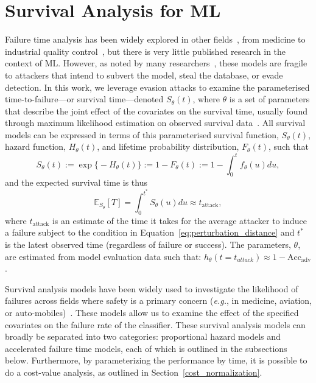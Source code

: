 \section{Survival Analysis for ML}
\label{aft_models}

Failure time analysis has been widely explored in other fields~\cite{aft_models}, from medicine to industrial quality control~\cite{ai_medical_imaging,ai_industry,ai_luggage}, but there is very little published research in the context of ML\@.
However, as noted by many researchers~\cite{madry2017towards,carlini_towards_2017,meyers}, these models are fragile to attackers that intend to subvert the model, steal the database, or evade detection.
In this work, we leverage evasion attacks to examine the parameterised time-to-failure---or survival time---denoted $S_{\theta}(t)$, where $\theta$ is a set of parameters that describe the joint effect of the covariates on the survival time, usually found through maximum likelihood estimation on observed survival data~\cite{collett2023modelling}.
All survival models can be expressed in terms of this parameterised survival function, $S_\theta(t)$, hazard function, $H_\theta(t)$, and lifetime probability distribution, $F_{\theta}(t)$, such that
\[
	S_{\theta}(t) := \exp\big\{-H_{\theta}(t)\big\} := 1 - F_{\theta}(t) := 1 - \int_0^t f_\theta(u) du,
\]
and the expected survival time is thus
\[
	\mathbb{E}_{S_\theta}[T] =  \int_{0}^{t^*} S_{\theta}(u) du \approx t_{\mathrm{attack}},
\]
where $t_{\mathrm{attack}}$ is an estimate of the time it takes for the average attacker to induce a failure subject to the condition in Equation~\ref{eq:perturbation_distance} and $t^*$ is the latest observed time (regardless of failure or success).
The parameters, $\theta$, are estimated from model evaluation data such that: $h_{\theta}(t=t_{attack}) \approx 1 - \mathrm{Acc}_{\mathrm{adv}}$.

Survival analysis models have been widely used to investigate the likelihood of failures across fields where safety is a primary concern (\textit{e.g.}, in medicine, aviation, or auto-mobiles)~\cite{liu2013development,lawless1995methods}. These models allow us to examine the effect of the specified covariates on the failure rate of the classifier.
These survival analysis models can broadly be separated into two categories: proportional hazard models and accelerated failure time models, each of which is outlined in the subsections below.
Furthermore, by parameterizing the performance by time, it is possible to do a cost-value analysis, as outlined in Section~\ref{cost_normalization}.



